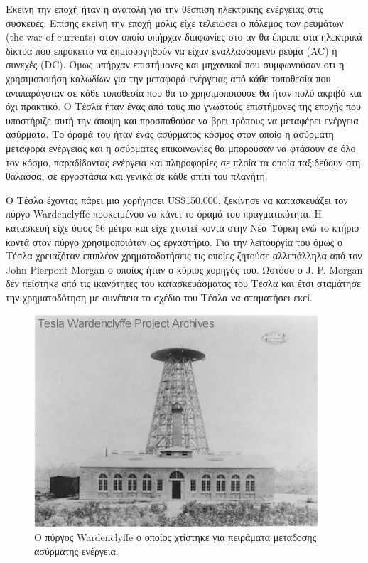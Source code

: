 Εκείνη την εποχή ήταν η ανατολή για την θέσπιση ηλεκτρικής ενέργειας στις συσκευές. Επίσης εκείνη την εποχή μόλις είχε τελειώσει ο πόλεμος των ρευμάτων (the war of
currents) στον οποίο υπήρχαν διαφωνίες στο αν θα έπρεπε στα ηλεκτρικά δίκτυα που επρόκειτο να δημιουργηθούν να είχαν εναλλασσόμενο ρεύμα (AC) ή συνεχές (DC). Όμως
υπήρχαν επιστήμονες και μηχανικοί που συμφωνούσαν οτι η χρησιμοποιήση καλωδίων για την μεταφορά ενέργειας από κάθε τοποθεσία που αναπαράγοταν σε κάθε τοποθεσία που
θα το χρησιμοποιούσε θα ήταν πολύ ακριβό και όχι πρακτικό. Ο Τέσλα ήταν ένας από τους πιο γνωστούς επιστήμονες της εποχής που υποστήριζε αυτή την άποψη και
προσπαθούσε να βρει τρόπους να μεταφέρει ενέργεια ασύρματα. Το όραμά του ήταν ένας ασύρματος κόσμος στον οποίο η ασύρματη μεταφορά ενέργειας και η ασύρματες
επικοινωνίες θα μπορούσαν να φτάσουν σε όλο τον κόσμο, παραδίδοντας ενέργεια και πληροφορίες σε πλοία τα οποία ταξιδεύουν στη θάλασσα, σε εργοστάσια και γενικά σε
κάθε σπίτι του πλανήτη.

Ο Τέσλα έχοντας πάρει μια χορήγησει US\$150.000, ξεκίνησε να κατασκευάζει τον πύργο Wardenclyffe προκειμένου να κάνει το όραμά του πραγματικότητα. Η κατασκευή είχε
ύψος 56 μέτρα και είχε χτιστεί κοντά στην Νέα Υόρκη ενώ το κτήριο κοντά στον πύργο χρησιμοποιόταν ως εργαστήριο. Για την λειτουργία του όμως ο Tέσλα χρειαζόταν
επιπλέον χρηματοδοτήσεις τις οποίες ζητούσε αλλεπάλληλα από τον John Pierpont Morgan ο οποίος ήταν ο κύριος χορηγός του. Ωστόσο ο J. P. Morgan δεν πείστηκε από τις
ικανότητες του κατασκευάσματος του Τέσλα και έτσι σταμάτησε την χρηματοδότηση με συνέπεια το σχέδιο του Τέσλα να σταματήσει εκεί.

\begin{figure}[h]
	\centering
	\includegraphics[width=\textwidth]{images/Wardenclyffe_Tower.jpg}
	\caption{Ο πύργος Wardenclyffe ο οποίος χτίστηκε για πειράματα μεταδοσης ασύρματης ενέργεια.}
	\label{fig:Wardenclyffe_Tower}
\end{figure}


